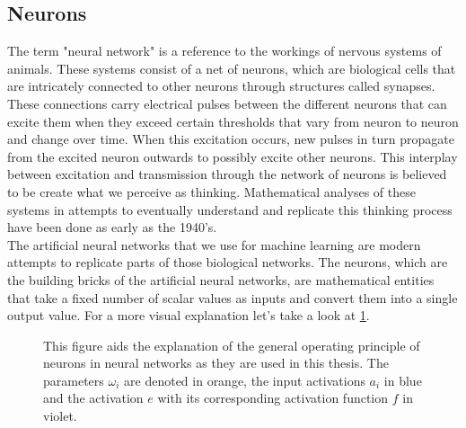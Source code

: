\subsection{Neurons}
The term "neural network" is a reference to the workings of nervous systems of animals. These systems consist of a net of neurons, which are biological cells that are intricately connected to other neurons through structures called synapses. These connections carry electrical pulses between the different neurons that can excite them when they exceed certain thresholds that vary from neuron to neuron and change over time. When this excitation occurs, new pulses in turn propagate from the excited neuron outwards to possibly excite other neurons. This interplay between excitation and transmission through the network of neurons is believed to be create what we perceive as thinking. Mathematical analyses of these systems in attempts to eventually understand and replicate this thinking process have been done as early as the 1940's.\cite{A_logical_calculus_of_the_ideas_immanent_in_nervous_activity}\\
The artificial neural networks that we use for machine learning are modern attempts to replicate parts of those biological networks. The neurons, which are the building bricks of the artificial neural networks, are mathematical entities that take a fixed number of scalar values as inputs and convert them into a single output value. For a more visual explanation let's take a look at \cref{fig:Neuron_explanation}.
\begin{figure}
	\centering
	
	\caption{This figure aids the explanation of the general operating principle of neurons in neural networks as they are used in this thesis. The parameters $\omega_i$ are denoted in orange, the input activations $a_i$ in blue and the activation $e$ with its corresponding activation function $f$ in violet.}
	\label{fig:Neuron_explanation}
\end{figure}
